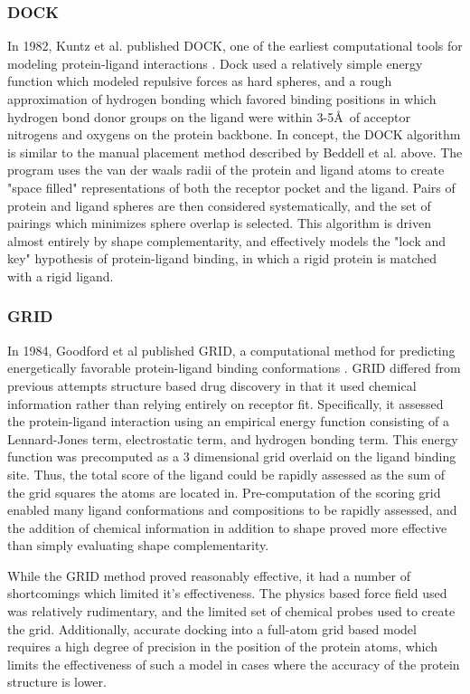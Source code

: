 \subsubsection{DOCK}
In 1982, Kuntz et al. published DOCK, one of the earliest computational tools for modeling protein-ligand interactions \citep{Kuntz:1982wx}.  Dock used a relatively simple energy function which modeled repulsive forces as hard spheres, and a rough approximation of hydrogen bonding which favored binding positions in which hydrogen bond donor groups on the ligand were within 3-5\AA\ of acceptor nitrogens and oxygens on the protein backbone.
In concept, the DOCK algorithm is similar to the manual placement method described by Beddell et al. above. 
The program uses the van der waals radii of the protein and ligand atoms to create "space filled" representations of both the receptor pocket and the ligand.
Pairs of protein and ligand spheres are then considered systematically, and the set of pairings which minimizes sphere overlap is selected.
This algorithm is driven almost entirely by shape complementarity, and effectively models the "lock and key" hypothesis of protein-ligand binding, in which a rigid protein is matched with a rigid ligand.

\subsubsection{GRID}
In 1984, Goodford et al published GRID, a computational method for predicting energetically favorable protein-ligand binding conformations \citep{Goodford:1985bf}.
GRID differed from previous attempts structure based drug discovery in that it used chemical information rather than relying entirely on receptor fit. 
Specifically, it assessed the protein-ligand interaction using an empirical energy function consisting of a Lennard-Jones term, electrostatic term, and hydrogen bonding term.
This energy function was precomputed as a 3 dimensional grid overlaid on the ligand binding site.
Thus, the total score of the ligand could be rapidly assessed as the sum of the grid squares the atoms are located in.
Pre-computation of the scoring grid enabled many ligand conformations and compositions to be rapidly assessed, and the addition of chemical information in addition to shape proved more effective than simply evaluating shape complementarity.

While the GRID method proved reasonably effective, it had a number of shortcomings which limited it's effectiveness.
The physics based force field used was relatively rudimentary, and the limited set of chemical probes used to create the grid.
Additionally, accurate docking into a full-atom grid based model requires a high degree of precision in the position of the protein atoms, which limits the effectiveness of such a model in cases where the accuracy of the protein structure is lower.


